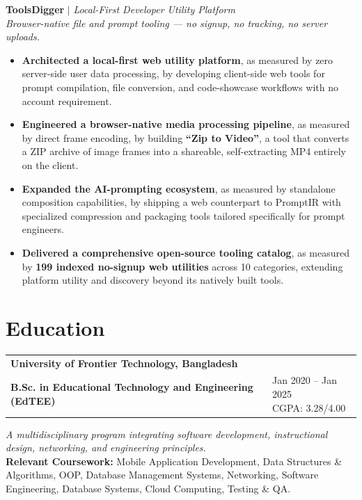 \documentclass[10pt,letterpaper]{article}
\newenvironment{highlights}{
  \begin{itemize}[topsep=2pt,parsep=1pt,partopsep=0pt,itemsep=0pt,leftmargin=10pt]
}{\end{itemize}}
\begin{document}
\textbf{ToolsDigger} $|$ \textit{Local-First Developer Utility Platform}
\hfill
\href{https://toolsdigger.com/}{\textcolor{myblue}{\faExternalLink*}}
\href{https://github.com/PulseDev11/toolsDigger}{\textcolor{myblue}{\faGithub}}\\
\textit{Browser-native file and prompt tooling --- no signup, no tracking, no server uploads.}
\begin{highlights}
  \item \textbf{Architected a local-first web utility platform}, as measured by zero server-side user data processing, by developing client-side web tools for prompt compilation, file conversion, and code-showcase workflows with no account requirement.
  \item \textbf{Engineered a browser-native media processing pipeline}, as measured by direct frame encoding, by building \textbf{``Zip to Video''}, a tool that converts a ZIP archive of image frames into a shareable, self-extracting MP4 entirely on the client.
  \item \textbf{Expanded the AI-prompting ecosystem}, as measured by standalone composition capabilities, by shipping a web counterpart to PromptIR with specialized compression and packaging tools tailored specifically for prompt engineers.
  \item \textbf{Delivered a comprehensive open-source tooling catalog}, as measured by \textbf{199 indexed no-signup web utilities} across 10 categories, extending platform utility and discovery beyond its natively built tools.
\end{highlights}

\vspace{5pt}

\section{Education}
\noindent\begin{tabularx}{\linewidth}{@{}X>{\raggedleft\arraybackslash}p{4.3cm}@{}}
\textbf{University of Frontier Technology, Bangladesh}\\[-3pt]
\textbf{B.Sc. in Educational Technology and Engineering (EdTEE)}
&
\shortstack[r]{Jan 2020 -- Jan 2025\\ CGPA: 3.28/4.00}
\end{tabularx}

\vspace{1pt}
\textit{A multidisciplinary program integrating software development, instructional design, networking, and engineering principles.}\\[3pt]
\textbf{Relevant Coursework:} Mobile Application Development, Data Structures \& Algorithms, OOP, Database Management Systems, Networking, Software Engineering, Database Systems, Cloud Computing, Testing \& QA.
\vspace{5pt}
\end{document}
